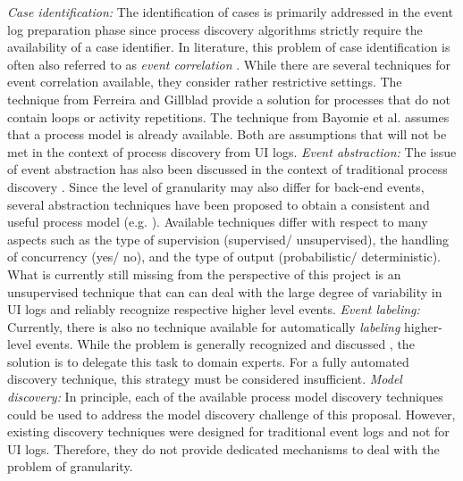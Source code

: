 \vspace{0.2em}
\newline%
\noindent \textit{Case identification:}  The identification of cases is primarily addressed in the event log preparation phase since process discovery algorithms strictly require the availability of a case identifier. In literature, this problem of case identification is often also referred to as \textit{event correlation} \cite{diba2020extraction}. While there are several techniques for event correlation available, they consider rather restrictive settings. The technique from Ferreira and Gillblad  \cite{ferreira2009discovering} provide a solution for processes that do not contain loops or activity repetitions. The technique from Bayomie et al. \cite{bayomie2019probabilistic} assumes that a process model is already available. Both are assumptions that will not be met in the context of process discovery from UI logs. 
\vspace{0.2em}
\newline%
\noindent \textit{Event abstraction:} The issue of event abstraction has also been discussed in the context of traditional process discovery \cite{van2020event,diba2020extraction}. Since the level of granularity may also differ for back-end events, several abstraction techniques have been proposed to obtain a consistent and useful process model (e.g. \cite{baier2014bridging,van2020event,de2020event}). Available techniques differ with respect to many aspects such as the type of supervision (supervised/ unsupervised), the handling of concurrency (yes/ no), and the type of output (probabilistic/ deterministic). What is currently still missing from the perspective of this project is an unsupervised technique that can can deal with the large degree of variability in UI logs and reliably recognize respective higher level events. 
\vspace{0.2em}
\newline%
\noindent \textit{Event labeling:} Currently, there is also no technique available for automatically \textit{labeling} higher-level events. While the problem is generally recognized and discussed \cite{van2020event,van2016enabling}, the  solution is to delegate this task to domain experts. For a fully automated discovery technique, this strategy must be considered insufficient.   
\vspace{0.2em}
\newline%
\noindent \textit{Model discovery:} In principle, each of the available process model discovery techniques could be used to address the model discovery challenge of this proposal. However, existing discovery techniques were designed for traditional event logs and not for UI logs. Therefore, they do not provide dedicated mechanisms to deal with the problem of granularity.  
 
